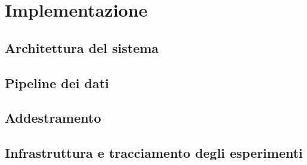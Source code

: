 \chapter{Implementazione}
\label{cap:implementazione}


\section{Architettura del sistema}
\label{sec:architettura}

\section{Pipeline dei dati}
\label{sec:pipeline-dati}

\section{Addestramento}
\label{sec:addestramento}

\section{Infrastruttura e tracciamento degli esperimenti}
\label{sec:infrastruttura}
